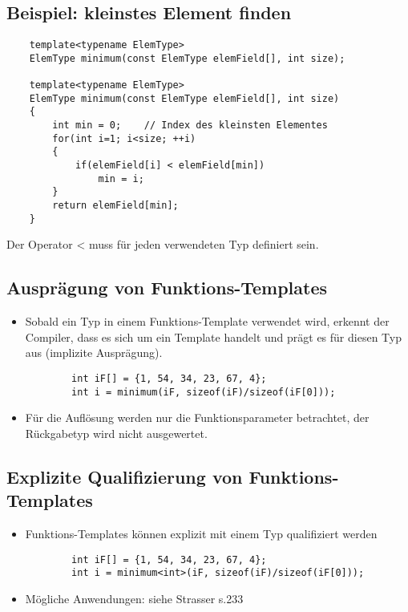 \subsection{Beispiel: kleinstes Element finden}
\label{sec:Beispiel: kleinstes Element finden}
\noindent
\begin{minipage}{\linewidth}
	\begin{lstlisting}
	template<typename ElemType>
	ElemType minimum(const ElemType elemField[], int size);
	
	template<typename ElemType>
	ElemType minimum(const ElemType elemField[], int size)
	{
		int min = 0;	// Index des kleinsten Elementes
		for(int i=1; i<size; ++i)
		{
			if(elemField[i] < elemField[min])
				min = i;
		}
		return elemField[min];
	}
	\end{lstlisting}
\end{minipage}
\begin{achtung}
Der Operator < muss für jeden verwendeten Typ definiert sein.
\end{achtung}

\subsection{Ausprägung von Funktions-Templates}
\label{sec:Auspraegung von Funktions-Templates}
\begin{itemize}
	\item Sobald ein Typ in einem Funktions-Template verwendet wird, erkennt der Compiler, dass es sich um ein Template handelt und prägt es für diesen Typ aus (implizite Ausprägung).
	\noindent
	\begin{minipage}{\linewidth}
		\begin{lstlisting}
		int iF[] = {1, 54, 34, 23, 67, 4};
		int i = minimum(iF, sizeof(iF)/sizeof(iF[0]));
		\end{lstlisting}
	\end{minipage}
	\item Für die Auflösung werden nur die Funktionsparameter betrachtet, der Rückgabetyp wird nicht ausgewertet.
\end{itemize}

\subsection{Explizite Qualifizierung von Funktions-Templates}
\label{sec:Explizite Qualifizierung von Funktions-Templates}
\begin{itemize}
	\item Funktions-Templates können explizit mit einem Typ qualifiziert werden
	\noindent
	\begin{minipage}{\linewidth}
		\begin{lstlisting}
		int iF[] = {1, 54, 34, 23, 67, 4};
		int i = minimum<int>(iF, sizeof(iF)/sizeof(iF[0]));
		\end{lstlisting}
	\end{minipage}
	\item Mögliche Anwendungen: siehe Strasser s.233
\end{itemize}

